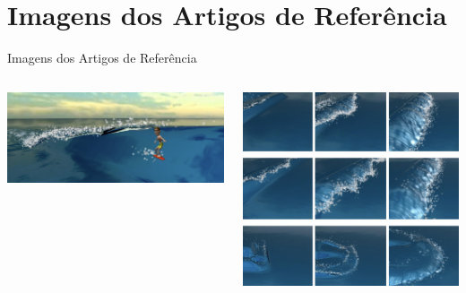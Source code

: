 \documentclass[aspectratio=169,xcolor=table]{beamer}
\begin{document}
\section{Imagens dos Artigos de Referência}
\begin{frame}{Imagens dos Artigos de Referência}
    \begin{columns}
        \centering
        \includegraphics[width=\textwidth]{imgs/wave-artigo-1.png}
        
        \centering
        \includegraphics[width=\textwidth]{imgs/wave-artigo-2.png}
    \end{columns}
\end{frame}


\end{document}
